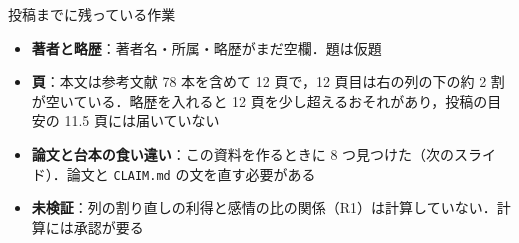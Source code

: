 \begin{frame}{投稿までに残っている作業}
  \vspace{0.3em}
  \begin{itemize}\footnotesize\setlength{\itemsep}{7pt}
    \item \textbf{著者と略歴}：著者名・所属・略歴がまだ空欄．題は仮題
    \item \textbf{頁}：本文は参考文献 78 本を含めて 12 頁で，12 頁目は右の列の下の約 2 割が空いている．略歴を入れると 12 頁を少し超えるおそれがあり，投稿の目安の 11.5 頁には届いていない
    \item \textbf{論文と台本の食い違い}：この資料を作るときに 8 つ見つけた（次のスライド）．論文と \texttt{CLAIM.md} の文を直す必要がある
    \item \textbf{未検証}：列の割り直しの利得と感情の比の関係（R1）は計算していない．計算には承認が要る
  \end{itemize}
\end{frame}

